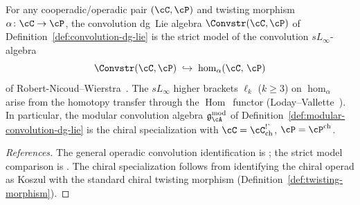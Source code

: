 \begin{theorem}[Convolution = master object identification;
\ClaimStatusProvedElsewhere]
\label{thm:convolution-master-identification}
For any cooperadic/operadic pair $(\cC, \cP)$ and twisting
morphism~$\alpha\colon \cC \to \cP$, the convolution dg~Lie algebra
$\Convstr(\cC, \cP)$ of
Definition~\textup{\ref{def:convolution-dg-lie}}
is the strict model of the convolution $sL_\infty$-algebra
\[
\Convstr(\cC, \cP)
\;\hookrightarrow\;
\operatorname{hom}_\alpha(\cC,\, \cP)
\]
of Robert-Nicoud--Wierstra~\textup{\cite[Theorem~4.1]{RNW19}}.
The $sL_\infty$ higher brackets $\ell_k$ ($k \geq 3$) on
$\operatorname{hom}_\alpha$ arise from the homotopy transfer through
the $\operatorname{Hom}$~functor
\textup{(}Loday--Vallette~\textup{\cite[Theorem~10.3.8]{LV12})}.
In particular, the modular convolution algebra
$\mathfrak{g}_\cA^{\mathrm{mod}}$ of
Definition~\textup{\ref{def:modular-convolution-dg-lie}}
is the chiral specialization with
$\cC = \cC^{\textup{!\textasciigrave}}_{\mathrm{ch}}$,
$\cP = \cP^{\mathrm{ch}}$.
\end{theorem}

\begin{proof}[References]
The general operadic convolution identification is
\cite[Theorem~4.1]{RNW19}; the strict model comparison is
\cite[Theorem~10.3.8]{LV12}. The chiral specialization follows from
identifying the chiral operad as Koszul with the standard chiral
twisting morphism (Definition~\ref{def:twisting-morphism}).
\end{proof}

